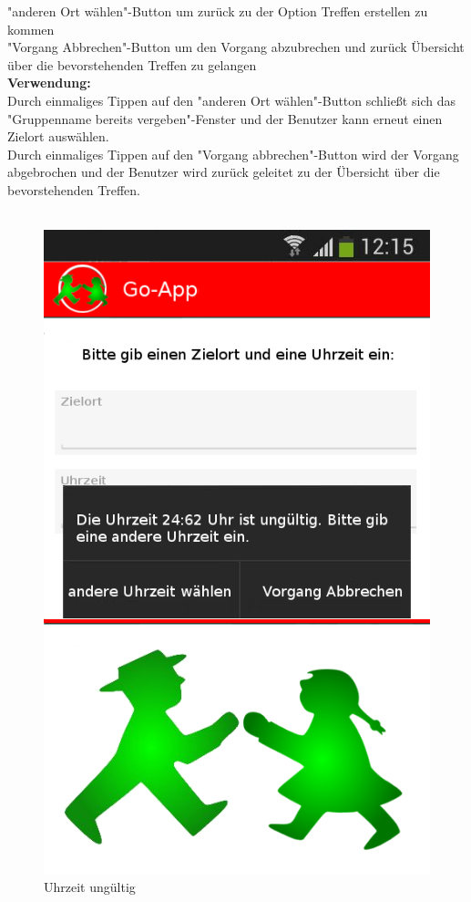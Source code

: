 "anderen Ort wählen"-Button um zurück zu der Option Treffen erstellen zu kommen\\
"Vorgang Abbrechen"-Button um den Vorgang abzubrechen und zurück Übersicht über die bevorstehenden Treffen zu gelangen\\
\textbf{Verwendung:}\\
Durch einmaliges Tippen auf den "anderen Ort wählen"-Button schließt sich das "Gruppenname bereits vergeben"-Fenster und der Benutzer kann erneut einen Zielort auswählen.\\
Durch einmaliges Tippen auf den "Vorgang abbrechen"-Button wird der Vorgang abgebrochen und der Benutzer wird zurück geleitet zu der Übersicht über die bevorstehenden Treffen.\\ \\

\begin{figure} [H]
	\caption{Uhrzeit ungültig}
\begin{center}
	\includegraphics[scale =0.5]{resources/images/treffpunkt_erstellen_ungueltig_Zeit.png}
\end{center}
\end{figure}
